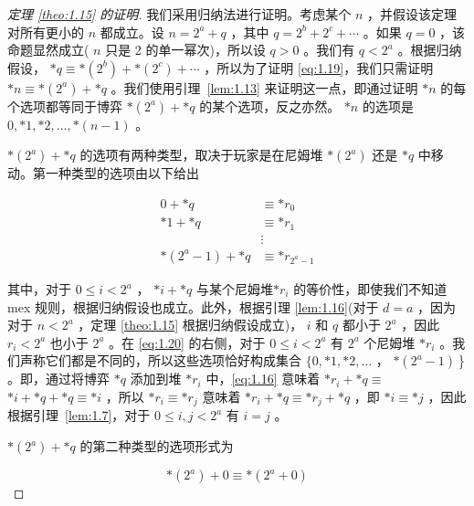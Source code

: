 \begin{proof}[定理 \ref{theo:1.15} 的证明]我们采用归纳法进行证明。考虑某个 \(n\) ，并假设该定理对所有更小的 \(n\) 都成立。设 \(n = {2}^{a} + q\) ，其中 \(q = {2}^{b} + {2}^{c} + \cdots\) 。如果 \(q = 0\) ，该命题显然成立( \(n\) 只是 2 的单一幂次)，所以设 \(q > 0\) 。我们有 \(q < {2}^{a}\) 。根据归纳假设， \(* q \equiv   * \left( {2}^{b}\right)  +  * \left( {2}^{c}\right)  + \cdots\) ，所以为了证明 \eqref{eq:1.19}，我们只需证明 \(* n \equiv   * \left( {2}^{a}\right)  +  * q\) 。我们使用引理~\ref{lem:1.13} 来证明这一点，即通过证明 \(* n\) 的每个选项都等同于博弈 \(* \left( {2}^{a}\right)  +  * q\) 的某个选项，反之亦然。 \(* n\) 的选项是 \(0, * 1, * 2,\ldots , * \left( {n - 1}\right)\) 。

\(* \left( {2}^{a}\right)  +  * q\) 的选项有两种类型，取决于玩家是在尼姆堆 \(* \left( {2}^{a}\right)\) 还是 \(* q\) 中移动。第一种类型的选项由以下给出
 

 

\begin{equation}
\begin{aligned}
    0 + *q &\equiv *r_0 \\
    *1 + *q &\equiv *r_1 \\
    &\vdots \\
    *(2^a - 1) + *q &\equiv *r_{2^a-1}
\end{aligned}
\label{eq:1.20}
\end{equation}



其中，对于 \(0 \leq  i < {2}^{a}\) ， \(* i +  * q\) 与某个尼姆堆\(* {r}_{i}\) 的等价性，即使我们不知道 mex 规则，根据归纳假设也成立。此外，根据引理 \ref{lem:1.16}(对于 \(d = a\) ，因为对于 \(n < {2}^{a}\) ，定理 \ref{theo:1.15} 根据归纳假设成立)， \(i\) 和 \(q\) 都小于 \({2}^{a}\) ，因此 \({r}_{i} < {2}^{a}\) 也小于 \({2}^{a}\) 。在 \eqref{eq:1.20} 的右侧，对于 \(0 \leq  i < {2}^{a}\) 有 \({2}^{a}\) 个尼姆堆 \(* {r}_{i}\) 。我们声称它们都是不同的，所以这些选项恰好构成集合 \(\{ 0, * 1, * 2,\ldots\) ， \(\left. {*\left( {{2}^{a} - 1}\right) }\right\}\) 。即，通过将博弈 \(* q\) 添加到堆 \(* {r}_{i}\) 中，\eqref{eq:1.16} 意味着 \(* {r}_{i} +  * q \equiv\)  \(* i +  * q +  * q \equiv   * i\) ，所以 \(* {r}_{i} \equiv   * {r}_{j}\) 意味着 \(* {r}_{i} +  * q \equiv   * {r}_{j} +  * q\) ，即 \(* i \equiv   * j\) ，因此根据引理~\ref{lem:1.7}，对于 \(0 \leq  i,j < {2}^{a}\) 有 \(i = j\) 。

\(* \left( {2}^{a}\right)  +  * q\) 的第二种类型的选项形式为

\[
* \left( {2}^{a}\right)  + 0 \equiv   * \left( {{2}^{a} + 0}\right)
\]


\end{proof}
